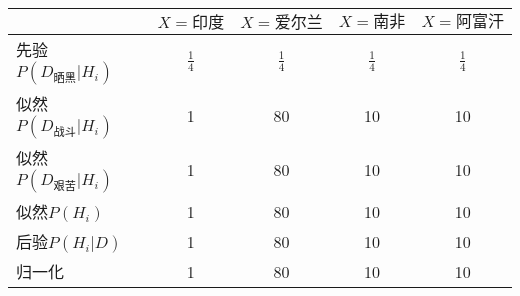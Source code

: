 \begin{table}
    \begin{tabular}{lcccc}
        \toprule
        & $X=印度$ & $X=爱尔兰$ & $X=南非$ & $X=阿富汗$\\
        \midrule
        先验$P(D_{晒黑}|H_i)$ & $\frac{1}{4}$ & $\frac{1}{4}$ & $\frac{1}{4}$ & $\frac{1}{4}$\\
        似然$P(D_{战斗}|H_i)$ & 1 & 80 & 10 & 10\\
        似然$P(D_{艰苦}|H_i)$ & 1 & 80 & 10 & 10\\
        似然$P(H_i)$ & 1 & 80 & 10 & 10\\
        \midrule
        后验$P(H_i|D)$ & 1 & 80 & 10 & 10\\
        归一化 & 1 & 80 & 10 & 10\\
        \bottomrule
    \end{tabular}
    \label{tab:bayes}
\end{table}